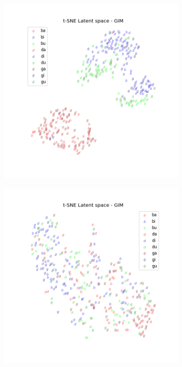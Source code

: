 \begin{figure}[ht]
\begin{subfigure}{0.45\linewidth}
					\caption{}
					\label{fig:t-sne-kld33-module2}
				\end{subfigure}
				\vspace{0cm}
				\begin{subfigure}{0.45\linewidth}
					\centering					
					\includegraphics[width=\linewidth]{"t-sne kld=0 module 1"}
					\caption{}
					\label{fig:t-sne-kld0-module-1}
				\end{subfigure}
				\hspace{0cm}
				\begin{subfigure}{0.45\linewidth}
					\centering
					\includegraphics[width=\linewidth]{"t-sne kld=0 module 2"}

\end{subfigure}
\end{figure}
